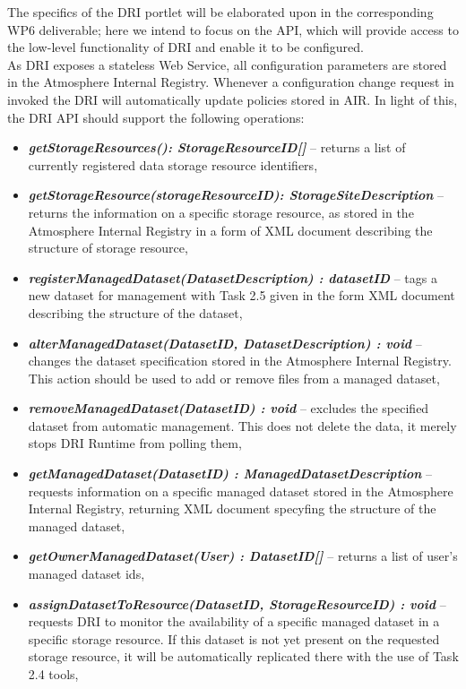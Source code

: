 \documentclass[a4paper,12pt,titlepage]{article}
\begin{document}
\noindent
The specifics of the DRI portlet will be elaborated upon in the corresponding WP6 deliverable; here we intend to focus on the API, which will provide access to the low-level functionality of DRI and enable it to be configured.\\

\noindent
As DRI exposes a stateless Web Service, all configuration parameters are stored in the Atmosphere Internal Registry. Whenever a configuration change request in invoked the DRI will automatically update policies stored in AIR. In light of this, the DRI API should support the following operations:

\begin{itemize}
\item \textbf{\textit{getStorageResources(): StorageResourceID[]}} -- returns a list of currently registered data storage resource identifiers,
\item \textbf{\textit{getStorageResource(storageResourceID): StorageSiteDescription}} -- returns the information on a specific storage resource, as stored in the Atmosphere Internal Registry in a form of XML document describing the structure of storage resource,
\item \textbf{\textit{registerManagedDataset(DatasetDescription) : datasetID}} -- tags a new dataset for management with Task 2.5 given in the form XML document describing the structure of the dataset, 
\item \textbf{\textit{alterManagedDataset(DatasetID, DatasetDescription) : void}} -- changes the dataset specification stored in the Atmosphere Internal Registry. This action should be used to add or remove files from a managed dataset,
\item \textbf{\textit{removeManagedDataset(DatasetID) : void}} -- excludes the specified dataset from automatic management. This does not delete the data, it merely stops DRI Runtime from polling them,
\item \textbf{\textit{getManagedDataset(DatasetID) : ManagedDatasetDescription}} -- requests information on a specific managed dataset stored in the Atmosphere Internal Registry, returning XML document specyfing the structure of the managed dataset,
\item \textbf{\textit{getOwnerManagedDataset(User) : DatasetID[]}} -- returns a list of user's managed dataset ids,
\item \textbf{\textit{assignDatasetToResource(DatasetID, StorageResourceID) : void}} -- requests DRI to monitor the availability of a specific managed dataset in a specific storage resource. If this dataset is not yet present on the requested storage resource, it will be automatically replicated there with the use of Task 2.4 tools,

\end{itemize}
\end{document}
